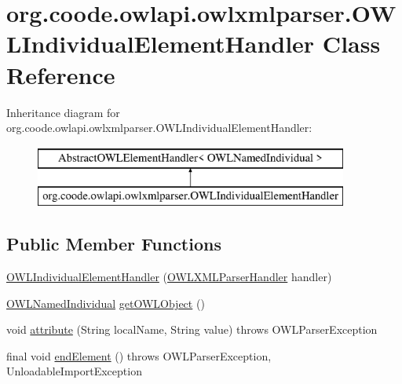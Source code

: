 \hypertarget{classorg_1_1coode_1_1owlapi_1_1owlxmlparser_1_1_o_w_l_individual_element_handler}{\section{org.\-coode.\-owlapi.\-owlxmlparser.\-O\-W\-L\-Individual\-Element\-Handler Class Reference}
\label{classorg_1_1coode_1_1owlapi_1_1owlxmlparser_1_1_o_w_l_individual_element_handler}
}
Inheritance diagram for org.\-coode.\-owlapi.\-owlxmlparser.\-O\-W\-L\-Individual\-Element\-Handler\-:\begin{figure}[H]
\begin{center}
\leavevmode
\includegraphics[height=2.000000cm]{classorg_1_1coode_1_1owlapi_1_1owlxmlparser_1_1_o_w_l_individual_element_handler}
\end{center}
\end{figure}
\subsection*{Public Member Functions}
\begin{DoxyCompactItemize}
\item 
\hyperlink{classorg_1_1coode_1_1owlapi_1_1owlxmlparser_1_1_o_w_l_individual_element_handler_a5b58c0dccd6103b30d38929e75926220}{O\-W\-L\-Individual\-Element\-Handler} (\hyperlink{classorg_1_1coode_1_1owlapi_1_1owlxmlparser_1_1_o_w_l_x_m_l_parser_handler}{O\-W\-L\-X\-M\-L\-Parser\-Handler} handler)
\item 
\hyperlink{interfaceorg_1_1semanticweb_1_1owlapi_1_1model_1_1_o_w_l_named_individual}{O\-W\-L\-Named\-Individual} \hyperlink{classorg_1_1coode_1_1owlapi_1_1owlxmlparser_1_1_o_w_l_individual_element_handler_ae657ee50b96597cdff1ca4ada76f6584}{get\-O\-W\-L\-Object} ()
\item 
void \hyperlink{classorg_1_1coode_1_1owlapi_1_1owlxmlparser_1_1_o_w_l_individual_element_handler_aee4794dc86c10634ca1eed483b2686f0}{attribute} (String local\-Name, String value)  throws O\-W\-L\-Parser\-Exception 
\item 
final void \hyperlink{classorg_1_1coode_1_1owlapi_1_1owlxmlparser_1_1_o_w_l_individual_element_handler_a1f96260ebd49d69c08f19e0b1651b8f1}{end\-Element} ()  throws O\-W\-L\-Parser\-Exception, Unloadable\-Import\-Exception 
\end{DoxyCompactItemize}
